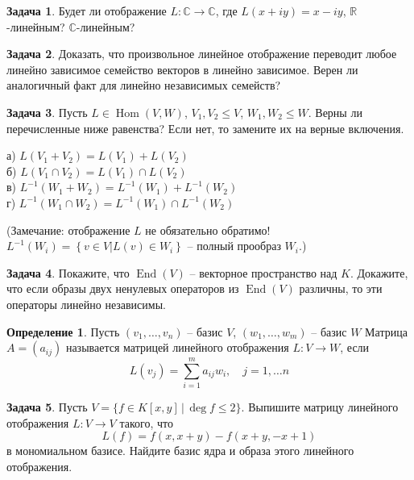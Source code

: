 \documentclass[12pt, fleqn]{extarticle}
\newcommand{\real}{\mathbb{R}}
\newcommand{\complex}{\mathbb{C}}
\newcommand{\curvedbrackets}[1]{\left\{#1\right\}}
\DeclareMathOperator{\Hom}{Hom}
\DeclareMathOperator{\End}{End}
\theoremstyle{definition}
\newtheorem{definition}{Определение}
\newtheorem{problem}{Задача}
\theoremstyle{remark}
\begin{document}
\begin{problem}
Будет ли отображение $L \colon \complex \to \complex$, 
где $L(x+iy)=x-iy$, $\real$-линейным? $\complex$-линейным?
\end{problem}

\begin{problem}
Доказать, что произвольное линейное отображение 
переводит любое линейно зависимое семейство векторов в линейно зависимое. 
Верен ли аналогичный факт для линейно независимых семейств?
\end{problem}


\begin{problem} 
Пусть $L \in \Hom(V, W)$, $V_{1}, V_{2} \leqslant V$,
$W_{1}, W_{2} \leqslant W$.
Верны ли перечисленные ниже равенства? 
Если нет, то замените их на верные включения.

а) $L(V_{1} + V_{2}) = L(V_{1}) + L(V_{2})$\\
б) $L(V_{1} \cap V_{2}) = L(V_{1}) \cap L(V_{2})$\\
в) $L^{-1}(W_{1} + W_{2}) = 
L^{-1}(W_{1}) + L^{-1}(W_{2})$\\
г) $L^{-1}(W_{1} \cap W_{2}) =
 L^{-1}(W_{1}) \cap L^{-1}(W_{2})$
 
(Замечание: отображение $L$ не обязательно обратимо! 
$L^{-1}(W_{i}) = \curvedbrackets{v \in V \vert L(v) \in W_{i}}$ 
-- полный прообраз $W_{i}$.)
\end{problem}

\begin{problem} 
Покажите, что $\End(V)$ -- векторное пространство над $K$.
Докажите, что если образы двух ненулевых операторов из
$\End(V)$ различны, то эти операторы линейно независимы.
\end{problem}


\begin{definition}
Пусть $(v_{1}, \ldots, v_{n})$ -- базис $V$, 
$(w_{1}, \ldots, w_{m})$ -- базис $W$
Матрица $A = (a_{ij})$ называется матрицей линейного отображения 
$L: V \rightarrow W$, если 
$$L(v_{j}) = \sum\limits_{i = 1}^{m} a_{ij}w_{i}, \quad j = 1, \ldots n$$
\end{definition}


\begin{problem}
Пусть $V=\{ f\in K[x,y]\,|\, \deg f\leq 2\}$. 
Выпишите матрицу линейного отображения $L\colon V\to V$ такого, что 
$$L(f)=f(x,x+y)-f(x+y,-x+1)$$  
в мономиальном базисе. Найдите базис ядра и образа этого линейного отображения.
\end{problem}
\end{document}
